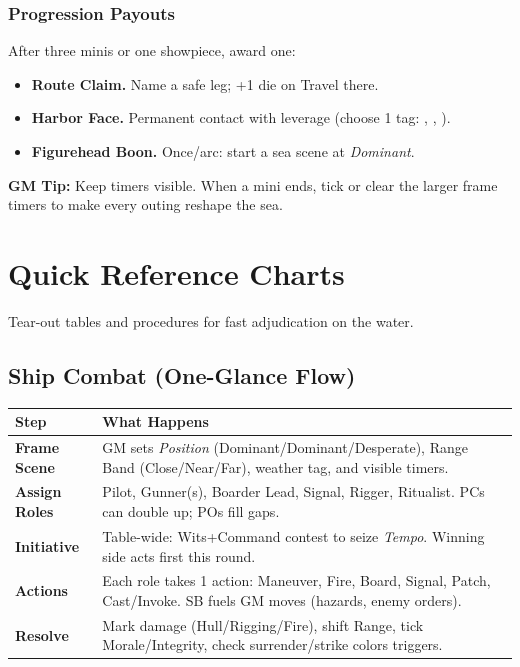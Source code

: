 \documentclass[11pt,oneside]{book}
\newcommand{\tagpill}[1]{\begingroup
  \setlength{\fboxsep}{1pt}\color{black}\fbox{\footnotesize\textsf{#1}}
\endgroup}
\begin{document}
\begin{itemize}
\subsection*{Progression Payouts}
After three minis or one showpiece, award one:
\begin{itemize}[leftmargin=*,itemsep=2pt]
  \item \textbf{Route Claim.} Name a safe leg; +1 die on Travel there.
  \item \textbf{Harbor Face.} Permanent contact with leverage (choose 1 tag: \tagpill{GRAFT}, \tagpill{LEGAL}, \tagpill{RITUAL}).
  \item \textbf{Figurehead Boon.} Once/arc: start a sea scene at \emph{Dominant}.
\end{itemize}

\begin{tcolorbox}[breakable]
\textbf{GM Tip:} Keep timers visible. When a mini ends, tick or clear the larger frame timers to make every outing reshape the sea.
\end{tcolorbox}

\appendix
\chapter{Quick Reference Charts}

\noindent Tear-out tables and procedures for fast adjudication on the water.

\section*{Ship Combat (One-Glance Flow)}
\begin{tabularx}{\linewidth}{@{}p{3.0cm} X@{}}
\toprule
\textbf{Step} & \textbf{What Happens}\\
\midrule
\textbf{Frame Scene} & GM sets \emph{Position} (Dominant/Dominant/Desperate), Range Band (Close/Near/Far), weather tag, and visible timers.\\
\textbf{Assign Roles} & Pilot, Gunner(s), Boarder Lead, Signal, Rigger, Ritualist. PCs can double up; POs fill gaps.\\
\textbf{Initiative} & Table-wide: Wits+Command contest to seize \emph{Tempo}. Winning side acts first this round.\\
\textbf{Actions} & Each role takes 1 action: Maneuver, Fire, Board, Signal, Patch, Cast/Invoke. SB fuels GM moves (hazards, enemy orders).\\
\textbf{Resolve} & Mark damage (Hull/Rigging/Fire), shift Range, tick Morale/Integrity, check surrender/strike colors triggers.\\
\bottomrule
\end{tabularx}


\end{itemize}
\end{document}
